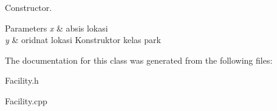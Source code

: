 Constructor. 


\begin{DoxyParams}{Parameters}
{\em x} & absis lokasi \\
\hline
{\em y} & oridnat lokasi Konstruktor kelas park \\
\hline
\end{DoxyParams}


The documentation for this class was generated from the following files\+:\begin{DoxyCompactItemize}
\item 
Facility.\+h\item 
Facility.\+cpp\end{DoxyCompactItemize}
